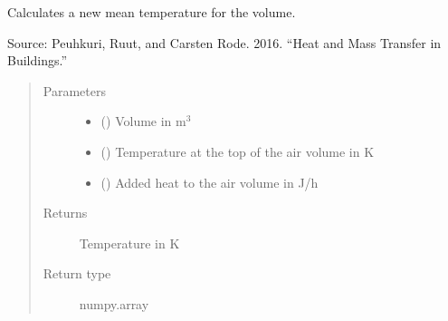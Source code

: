 \documentclass[letterpaper,10pt,english]{sphinxmanual}
\begin{document}
\begin{fulllineitems}
\label{\detokenize{air:livestock.air.new_mean_temperature}}
Calculates a new mean temperature for the volume.

Source: Peuhkuri, Ruut, and Carsten Rode. 2016.
“Heat and Mass Transfer in Buildings.”
\begin{quote}\begin{description}
\item[{Parameters}] \leavevmode\begin{itemize}
\item {} 
 () \textendash{} Volume in m$^{\text{3}}$

\item {} 
 () \textendash{} Temperature at the top of the air volume in K

\item {} 
 () \textendash{} Added heat to the air volume in J/h

\end{itemize}

\item[{Returns}] \leavevmode
Temperature in K

\item[{Return type}] \leavevmode
numpy.array

\end{description}\end{quote}

\end{fulllineitems}

\end{document}
